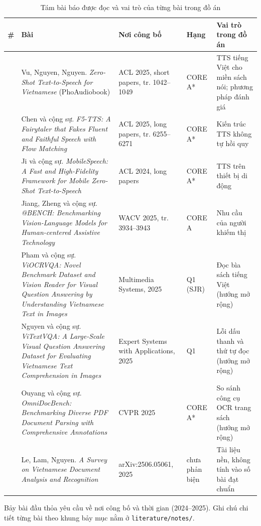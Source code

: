 \documentclass[12pt,a4paper]{article}
\begin{document}
{\small
\begin{longtable}[]{@{}>{\raggedright\arraybackslash}p{0.4cm}>{\raggedright\arraybackslash}p{5.2cm}>{\raggedright\arraybackslash}p{3.0cm}>{\raggedright\arraybackslash}p{1.5cm}>{\raggedright\arraybackslash}p{3.9cm}@{}}
\caption{Tám bài báo được đọc và vai trò của từng bài trong đồ án}\label{tab:bai-bao}\\
\toprule\noalign{}
\# & Bài & Nơi công bố & Hạng & Vai trò trong đồ án \\
\midrule\noalign{}
\endhead
\bottomrule\noalign{}
\endlastfoot
1 & Vu, Nguyen, Nguyen. \emph{Zero-Shot Text-to-Speech for Vietnamese} (PhoAudiobook) & ACL 2025, short papers, tr. 1042--1049 & CORE A* & TTS tiếng Việt cho miền sách nói; phương pháp đánh giá \\
2 & Chen và cộng sự. \emph{F5-TTS: A Fairytaler that Fakes Fluent and Faithful Speech with Flow Matching} & ACL 2025, long papers, tr. 6255--6271 & CORE A* & Kiến trúc TTS không tự hồi quy \\
3 & Ji và cộng sự. \emph{MobileSpeech: A Fast and High-Fidelity Framework for Mobile Zero-Shot Text-to-Speech} & ACL 2024, long papers & CORE A* & TTS trên thiết bị di động \\
4 & Jiang, Zheng và cộng sự. \emph{@BENCH: Benchmarking Vision-Language Models for Human-centered Assistive Technology} & WACV 2025, tr. 3934--3943 & CORE A & Nhu cầu của người khiếm thị \\
5 & Pham và cộng sự. \emph{ViOCRVQA: Novel Benchmark Dataset and Vision Reader for Visual Question Answering by Understanding Vietnamese Text in Images} & Multimedia Systems, 2025 & Q1 (SJR) & Đọc bìa sách tiếng Việt (hướng mở rộng) \\
6 & Nguyen và cộng sự. \emph{ViTextVQA: A Large-Scale Visual Question Answering Dataset for Evaluating Vietnamese Text Comprehension in Images} & Expert Systems with Applications, 2025 & Q1 & Lỗi dấu thanh và thứ tự đọc (hướng mở rộng) \\
7 & Ouyang và cộng sự. \emph{OmniDocBench: Benchmarking Diverse PDF Document Parsing with Comprehensive Annotations} & CVPR 2025 & CORE A* & So sánh công cụ OCR trang sách (hướng mở rộng) \\
8 & Le, Lam, Nguyen. \emph{A Survey on Vietnamese Document Analysis and Recognition} & arXiv:2506.05061, 2025 & chưa phản biện & Tài liệu nền, không tính vào số bài đạt chuẩn \\
\end{longtable}
}

Bảy bài đầu thỏa yêu cầu về nơi công bố và thời gian (2024--2025). Ghi chú chi tiết từng bài theo khung bảy mục nằm ở \texttt{literature/notes/}.
\end{document}

